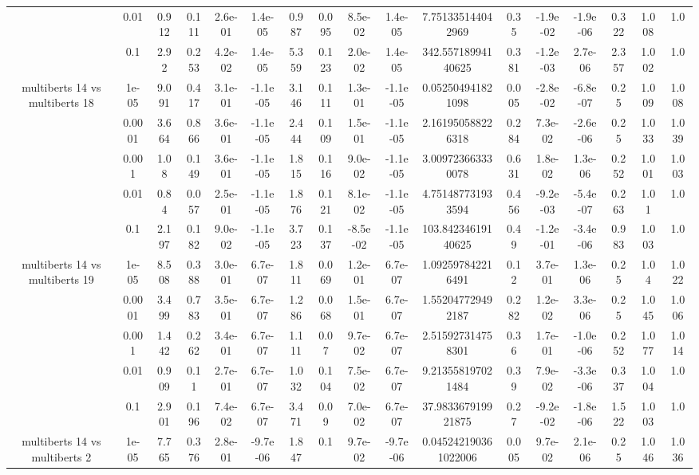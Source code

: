 \begin{tabular}{|c|c|c|c|c|c|c|c|c|c|c|c|c|c|c|c|c|}
 & 0.01 & 0.912 & 0.111 & 2.6e-01 & 1.4e-05 & 0.987 & 0.095 & 8.5e-02 & 1.4e-05 & 7.751335144042969 & 0.35 & -1.9e-02 & -1.9e-06 & 0.322 & 1.008 & 1.0 \\
 & 0.1 & 2.92 & 0.253 & 4.2e-02 & 1.4e-05 & 5.359 & 0.123 & 2.0e-02 & 1.4e-05 & 342.55718994140625 & 0.381 & -1.2e-03 & 2.7e-06 & 2.357 & 1.002 & 1.0 \\
\hline
\multirow{5}{*}{multiberts 14 vs multiberts 18} & 1e-05 & 9.091 & 0.417 & 3.1e-01 & -1.1e-05 & 3.146 & 0.111 & 1.3e-01 & -1.1e-05 & 0.052504941821098 & 0.005 & -2.8e-02 & -6.8e-07 & 0.25 & 1.009 & 1.008 \\
 & 0.0001 & 3.664 & 0.866 & 3.6e-01 & -1.1e-05 & 2.444 & 0.109 & 1.5e-01 & -1.1e-05 & 2.161950588226318 & 0.284 & 7.3e-02 & -2.6e-06 & 0.25 & 1.033 & 1.039 \\
 & 0.001 & 1.08 & 0.149 & 3.6e-01 & -1.1e-05 & 1.815 & 0.116 & 9.0e-02 & -1.1e-05 & 3.009723663330078 & 0.631 & 1.8e-02 & 1.3e-06 & 0.252 & 1.001 & 1.003 \\
 & 0.01 & 0.84 & 0.057 & 2.5e-01 & -1.1e-05 & 1.876 & 0.121 & 8.1e-02 & -1.1e-05 & 4.751487731933594 & 0.456 & -9.2e-03 & -5.4e-07 & 0.263 & 1.01 & 1.0 \\
 & 0.1 & 2.197 & 0.182 & 9.0e-02 & -1.1e-05 & 3.723 & 0.137 & -8.5e-02 & -1.1e-05 & 103.84234619140625 & 0.49 & -1.2e-01 & -3.4e-06 & 0.983 & 1.003 & 1.0 \\
\hline
\multirow{5}{*}{multiberts 14 vs multiberts 19} & 1e-05 & 8.508 & 0.388 & 3.0e-01 & 6.7e-07 & 1.811 & 0.069 & 1.2e-01 & 6.7e-07 & 1.092597842216491 & 0.12 & 3.7e-01 & 1.3e-06 & 0.25 & 1.04 & 1.022 \\
 & 0.0001 & 3.499 & 0.783 & 3.5e-01 & 6.7e-07 & 1.286 & 0.068 & 1.5e-01 & 6.7e-07 & 1.552047729492187 & 0.282 & 1.2e-02 & 3.3e-06 & 0.25 & 1.045 & 1.006 \\
 & 0.001 & 1.442 & 0.262 & 3.4e-01 & 6.7e-07 & 1.111 & 0.07 & 9.7e-02 & 6.7e-07 & 2.515927314758301 & 0.36 & 1.7e-01 & -1.0e-06 & 0.252 & 1.077 & 1.014 \\
 & 0.01 & 0.909 & 0.11 & 2.7e-01 & 6.7e-07 & 1.032 & 0.104 & 7.5e-02 & 6.7e-07 & 9.213558197021484 & 0.39 & 7.9e-02 & -3.3e-06 & 0.337 & 1.004 & 1.0 \\
 & 0.1 & 2.901 & 0.196 & 7.4e-02 & 6.7e-07 & 3.471 & 0.09 & 7.0e-02 & 6.7e-07 & 37.983367919921875 & 0.27 & -9.2e-02 & -1.8e-06 & 1.522 & 1.003 & 1.0 \\
\hline
\multirow{5}{*}{multiberts 14 vs multiberts 2} & 1e-05 & 7.765 & 0.376 & 2.8e-01 & -9.7e-06 & 1.847 & 0.1 & 9.7e-02 & -9.7e-06 & 0.045242190361022006 & 0.005 & 9.7e-02 & 2.1e-06 & 0.25 & 1.046 & 1.036 \\

\end{tabular}
